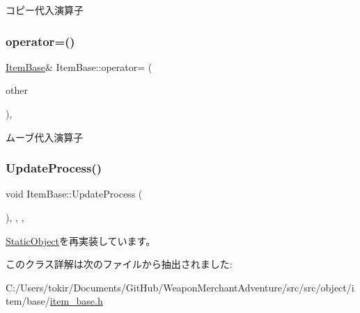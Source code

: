 コピー代入演算子 

\mbox{\label{class_item_base_a51a498e075511b0817ae827cdf1e3d5b}} 
\subsubsection{\texorpdfstring{operator=()}{operator=()}\hspace{0.1cm}{\footnotesize\ttfamily [2/2]}}
{\footnotesize\ttfamily \mbox{\hyperlink{class_item_base}{Item\+Base}}\& Item\+Base\+::operator= (\begin{DoxyParamCaption}\item[{\mbox{\hyperlink{class_item_base}{Item\+Base}} \&\&}]{other }\end{DoxyParamCaption})\hspace{0.3cm}{\ttfamily [inline]}, {\ttfamily [noexcept]}}



ムーブ代入演算子 

\mbox{\label{class_item_base_a8edff8edcf884f9590f973fd05d218bc}} 
\subsubsection{\texorpdfstring{Update\+Process()}{UpdateProcess()}}
{\footnotesize\ttfamily void Item\+Base\+::\+Update\+Process (\begin{DoxyParamCaption}{ }\end{DoxyParamCaption})\hspace{0.3cm}{\ttfamily [inline]}, {\ttfamily [final]}, {\ttfamily [protected]}, {\ttfamily [virtual]}}



\mbox{\hyperlink{class_static_object_a7fa678c3c4032bb6e9417f93a8bb895c}{Static\+Object}}を再実装しています。



このクラス詳解は次のファイルから抽出されました\+:\begin{DoxyCompactItemize}
\item 
C\+:/\+Users/tokir/\+Documents/\+Git\+Hub/\+Weapon\+Merchant\+Adventure/src/src/object/item/base/\mbox{\hyperlink{item__base_8h}{item\+\_\+base.\+h}}\end{DoxyCompactItemize}
